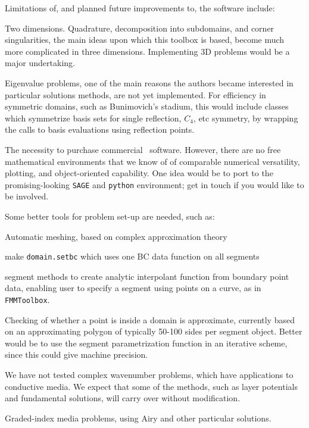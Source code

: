 \documentclass[12pt]{article}
\begin{document}
Limitations of, and planned future improvements to, the software include:

\bi
\item Two dimensions. Quadrature, decomposition into subdomains, and
corner singularities, the
main ideas upon which this toolbox is based, become much more complicated
in three dimensions. 
Implementing 3D problems would be a major undertaking.

\item Eigenvalue problems, one of the main reasons the authors became
interested in particular solutions methods, are not yet implemented.
For efficiency in symmetric domains, such as Bunimovich's stadium,
this would include
classes which symmetrize basis sets for single reflection, $C_4$, etc
symmetry, by wrapping the calls to basis evaluations using reflection
points.

\item The necessity to purchase commercial \matlab\ software.
However, there are no free mathematical environments that we know of
of comparable numerical versatility, plotting, and object-oriented capability.
One idea would be to port to the promising-looking {\tt SAGE} and {\tt python}
environment; get in touch if you would like to be involved.

\item Some better tools for problem set-up are needed, such as:
\bi
  \item Automatic meshing, based on complex approximation theory
  \item make {\tt domain.setbc} which uses one BC data function on all segments
  \item segment methods to create analytic interpolant function from boundary
point data, enabling user to specify a segment using points on a curve,
as in {\tt FMMToolbox}.
\ei

\item Checking of whether a point is inside a domain is approximate,
currently based on an approximating polygon of typically 50-100 sides
per segment object.
Better would be to use the segment parametrization function in
an iterative scheme, since this could give machine precision.

\item We have not tested complex wavenumber problems, which have
applications to conductive media. We expect that some of the
methods, such as layer potentials and fundamental solutions,
will carry over without modification.

\item Graded-index media problems, using Airy and other particular
solutions.
\end{document}
